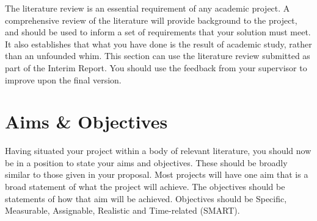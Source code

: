 The literature review is an essential requirement of any academic project. A comprehensive review of the literature will provide background to the project, and should be used to inform a set of requirements that your solution must meet. It also establishes that what you have done is the result of academic study, rather than an unfounded whim. This section can use the literature review submitted as part of the Interim Report. You should use the feedback from your supervisor to improve upon the final version.

\section{Aims \& Objectives}
Having situated your project within a body of relevant literature, you should now be in a position to state your aims and objectives. These should be broadly similar to those given in your proposal. Most projects will have one aim that is a broad statement of what the project will achieve. The objectives should be statements of how that aim will be achieved. Objectives should be Specific, Measurable, Assignable, Realistic and Time-related (SMART).